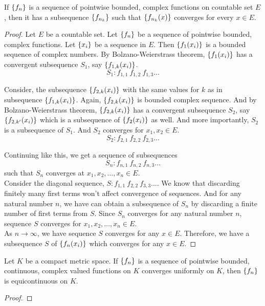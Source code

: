 \begin{theorem}
	If $\left\{f_n\right\}$ is a sequence of pointwise bounded, complex functions on countable set $E$, then it has a subsequence $\left\{f_{n_k}\right\}$ such that $\left\{f_{n_k}(x)\right\}$ converges for every $x \in E$.
\end{theorem}
\begin{proof}
	Let $E$ be a countable set.
	Let $\left\{f_n\right\}$ be a sequence of pointwise bounded, complex functions.
	Let $\left\{x_i\right\}$ be a sequence in $E$.
	Then $\left\{f_1(x_i)\right\}$ is a bounded sequence of complex numbers.
	By Bolzano-Weierstrass theorem,  $\left\{f_1(x_i)\right\}$ has a convergent subsequence $S_1$, say $\left\{f_{1,k}(x_i)\right\}$.
	\[ S_1 : f_{1,1}\ f_{1,2}\ f_{1,3} \dots \]

	Consider, the subsequence $\left\{f_{2,k}(x_i)\right\}$ with the same values for $k$ as in subsequence $\left\{f_{1,k}(x_i)\right\}$.
	Again, $\left\{f_{2,k}(x_i)\right\}$ is bounded complex sequence.
	And by Bolzano-Weierstrass theorem, $\left\{f_{2,k}(x_i)\right\}$ has a convergent subsequence $S_2$, say $\left\{f_{2,k'}(x_i)\right\}$ which is a subsequence of $\left\{f_2(x_i)\right\}$ as well.
	And more importantly, $S_2$ is a subsequence of $S_1$.
	And $S_2$ converges for $x_1,x_2 \in E$.
	\[ S_2 : f_{2,1}\ f_{2,2}\ f_{2,3} \dots \]

	Continuing like this, we get a sequence of subsequences
	\[ S_n : f_{n,1}\ f_{n,2}\ f_{n,3} \dots \]
	such that $S_n$ converges at $x_1,x_2,\dots,x_n \in E$.\\

	Consider the diagonal sequence, $S : f_{1,1}\ f_{2,2}\ f_{3,3} \dots $.
	We know that discarding finitely many first terms won't affect convergence of sequences.
	And for any natural number $n$, we have can obtain a subsequence of $S_n$ by discarding a finite number of first terms from $S$.
	Since $S_n$ converges for any natural number $n$, sequence $S$ converges for $x_1,x_2,\dots,x_n \in E$.\\

	As $n \to \infty$, we have sequence $S$ converges for any $x \in E$.
	Therefore, we have a subsequence $S$ of $\left\{f_n(x_i)\right\}$ which converges for any $x \in E$.
\end{proof}

\begin{theorem}
	Let $K$ be a compact metric space.
	If $\left\{f_n\right\}$ is a sequence of pointwise bounded, continuous, complex valued functions on $K$ converges uniformly on $K$, then $\left\{f_n\right\}$ is equicontinuous on $K$.
\end{theorem}
\begin{proof}
\end{proof}


